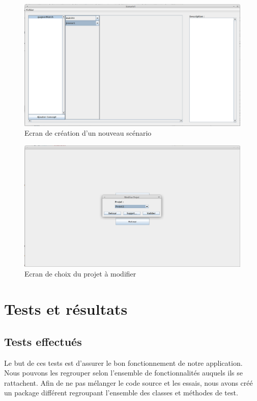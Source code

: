 \documentclass[12pt]{report}
\begin{document}
\begin{figure}
\centering
\includegraphics[scale=0.3]{IHM/remplissage_scenario.png}
\caption{Ecran de création d'un nouveau scénario}
\end{figure}



\begin{figure}
\centering
\includegraphics[scale=0.3]{IHM/modifier_projet_admin.png}
\caption{Ecran de choix du projet à modifier}
\end{figure}


\chapter{Tests et résultats}
\section{Tests effectués}
Le but de ces tests est d'assurer le bon fonctionnement de notre application. Nous pouvons les regrouper selon l'ensemble de fonctionnalités auquels ils se rattachent. Afin de ne pas mélanger le code source et les essais, nous avons créé un package différent regroupant l'ensemble des classes et méthodes de test. 
\end{document}
